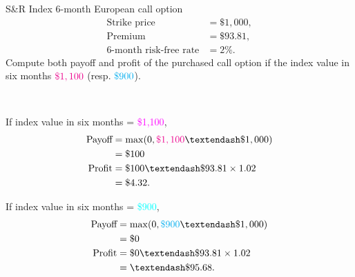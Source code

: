 \begin{frame}[fragile,t]
	\begin{myexample}
		 S\&R Index 6-month European call option
		 \begin{align*}
			 \text{Strike price}           & = \$1,000, \\
			 \text{Premium}                & = \$93.81, \\
			 \text{6-month risk-free rate} & = 2\%.
		 \end{align*}
		 Compute both payoff and profit of the \textcolor{alert}{purchased} call option if the index
		 value in six months $\textcolor{magenta}{\$1,100}$ (resp.  $\textcolor{cyan}{\$900}$).
	\end{myexample}
	\bigskip
	\pause
	\begin{mysol}\phantom{a}\\[1em]

	 \begin{minipage}{0.48\textwidth}
		\begin{center}
			If index value in six months = \textcolor{magenta}{\$1,100},
			\begin{align*}
				\text{Payoff} & = \max ( 0, \textcolor{magenta}{\$1,100} – \$1,000 ) \\
                      & = \$100                                              \\
				\text{Profit} & = \$100 – \$93.81 \times 1.02                        \\
                      & = \$4.32.
			\end{align*}
		\end{center}
	 \end{minipage}
	 \hfill \pause
	 \begin{minipage}{0.48\textwidth}
		\begin{center}
			If index value in six months = \textcolor{cyan}{\$900},
			\begin{align*}
				\text{Payoff} & = \max ( 0, \textcolor{cyan}{\$900} – \$1,000 ) \\
                      & = \$0                                           \\
				\text{Profit} & = \$0 – \$93.81 \times 1.02                     \\
                      & = – \$95.68.
			\end{align*}
		\end{center}
	 \end{minipage}

	 \myEnd
	\end{mysol}
\end{frame}
